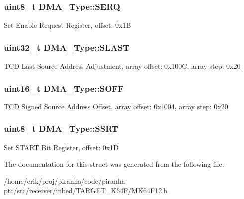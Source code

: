 \subsubsection[{\texorpdfstring{S\+E\+RQ}{SERQ}}]{ uint8\+\_\+t D\+M\+A\+\_\+\+Type\+::\+S\+E\+RQ}\hypertarget{structDMA__Type_aa748a20e0211655999242fa0697fcfd0}{}\label{structDMA__Type_aa748a20e0211655999242fa0697fcfd0}
Set Enable Request Register, offset\+: 0x1B 
\subsubsection[{\texorpdfstring{S\+L\+A\+ST}{SLAST}}]{ uint32\+\_\+t D\+M\+A\+\_\+\+Type\+::\+S\+L\+A\+ST}\hypertarget{structDMA__Type_a41bbed6bd0ab1bf8f00509380f2c5fe4}{}\label{structDMA__Type_a41bbed6bd0ab1bf8f00509380f2c5fe4}
T\+CD Last Source Address Adjustment, array offset\+: 0x100C, array step\+: 0x20 
\subsubsection[{\texorpdfstring{S\+O\+FF}{SOFF}}]{ uint16\+\_\+t D\+M\+A\+\_\+\+Type\+::\+S\+O\+FF}\hypertarget{structDMA__Type_a3a4e489d108c859aaec96af80714654e}{}\label{structDMA__Type_a3a4e489d108c859aaec96af80714654e}
T\+CD Signed Source Address Offset, array offset\+: 0x1004, array step\+: 0x20 
\subsubsection[{\texorpdfstring{S\+S\+RT}{SSRT}}]{ uint8\+\_\+t D\+M\+A\+\_\+\+Type\+::\+S\+S\+RT}\hypertarget{structDMA__Type_a9b7531a61f2523da000ffb17dd9c2739}{}\label{structDMA__Type_a9b7531a61f2523da000ffb17dd9c2739}
Set S\+T\+A\+RT Bit Register, offset\+: 0x1D 

The documentation for this struct was generated from the following file\+:\begin{DoxyCompactItemize}
\item 
/home/erik/proj/piranha/code/piranha-\/ptc/src/receiver/mbed/\+T\+A\+R\+G\+E\+T\+\_\+\+K64\+F/M\+K64\+F12.\+h\end{DoxyCompactItemize}
